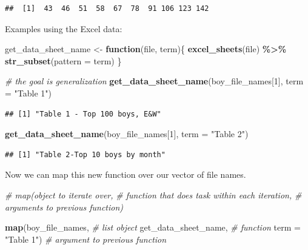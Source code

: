 \documentclass[
]{book}
\newenvironment{Shaded}{\begin{snugshade}}{\end{snugshade}}
\newcommand{\CommentTok}[1]{\textcolor[rgb]{0.56,0.35,0.01}{\textit{#1}}}
\newcommand{\ControlFlowTok}[1]{\textcolor[rgb]{0.13,0.29,0.53}{\textbf{#1}}}
\newcommand{\DataTypeTok}[1]{\textcolor[rgb]{0.13,0.29,0.53}{#1}}
\newcommand{\DecValTok}[1]{\textcolor[rgb]{0.00,0.00,0.81}{#1}}
\newcommand{\KeywordTok}[1]{\textcolor[rgb]{0.13,0.29,0.53}{\textbf{#1}}}
\newcommand{\NormalTok}[1]{#1}
\newcommand{\OperatorTok}[1]{\textcolor[rgb]{0.81,0.36,0.00}{\textbf{#1}}}
\newcommand{\StringTok}[1]{\textcolor[rgb]{0.31,0.60,0.02}{#1}}
\begin{document}
\begin{verbatim}
##  [1]  43  46  51  58  67  78  91 106 123 142
\end{verbatim}

Examples using the Excel data:

\begin{Shaded}
\begin{Highlighting}[]
\NormalTok{get\_data\_sheet\_name \textless{}{-}}\StringTok{ }\ControlFlowTok{function}\NormalTok{(file, term)\{}
  \KeywordTok{excel\_sheets}\NormalTok{(file) }\OperatorTok{\%\textgreater{}\%}\StringTok{ }\KeywordTok{str\_subset}\NormalTok{(}\DataTypeTok{pattern =}\NormalTok{ term)}
\NormalTok{\}}

\CommentTok{\# the goal is generalization }
\KeywordTok{get\_data\_sheet\_name}\NormalTok{(boy\_file\_names[}\DecValTok{1}\NormalTok{], }\DataTypeTok{term =} \StringTok{"Table 1"}\NormalTok{)}
\end{Highlighting}
\end{Shaded}

\begin{verbatim}
## [1] "Table 1 - Top 100 boys, E&W"
\end{verbatim}

\begin{Shaded}
\begin{Highlighting}[]
\KeywordTok{get\_data\_sheet\_name}\NormalTok{(boy\_file\_names[}\DecValTok{1}\NormalTok{], }\DataTypeTok{term =} \StringTok{"Table 2"}\NormalTok{)}
\end{Highlighting}
\end{Shaded}

\begin{verbatim}
## [1] "Table 2-Top 10 boys by month"
\end{verbatim}

Now we can map this new function over our vector of file names.

\begin{Shaded}
\begin{Highlighting}[]
\CommentTok{\# map(object to iterate over, }
\CommentTok{\#     function that does task within each iteration, }
\CommentTok{\#     arguments to previous function)}
 
\KeywordTok{map}\NormalTok{(boy\_file\_names,      }\CommentTok{\# list object}
\NormalTok{    get\_data\_sheet\_name, }\CommentTok{\# function}
    \DataTypeTok{term =} \StringTok{"Table 1"}\NormalTok{)    }\CommentTok{\# argument to previous function}
\end{Highlighting}
\end{Shaded}
\end{document}
